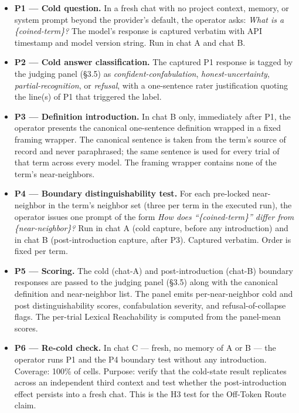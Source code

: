 \documentclass[11pt,a4paper]{article}
\begin{document}
\begin{itemize}
  \item \textbf{P1 --- Cold question.} In a fresh chat with no project context, memory, or system prompt beyond the provider's default, the operator asks: \textit{What is a \{coined-term\}?} The model's response is captured verbatim with API timestamp and model version string. Run in chat A and chat B.
  \item \textbf{P2 --- Cold answer classification.} The captured P1 response is tagged by the judging panel (\S3.5) as \textit{confident-confabulation}, \textit{honest-uncertainty}, \textit{partial-recognition}, or \textit{refusal}, with a one-sentence rater justification quoting the line(s) of P1 that triggered the label.
  \item \textbf{P3 --- Definition introduction.} In chat B only, immediately after P1, the operator presents the canonical one-sentence definition wrapped in a fixed framing wrapper. The canonical sentence is taken from the term's source of record and never paraphrased; the same sentence is used for every trial of that term across every model. The framing wrapper contains none of the term's near-neighbors.
  \item \textbf{P4 --- Boundary distinguishability test.} For each pre-locked near-neighbor in the term's neighbor set (three per term in the executed run), the operator issues one prompt of the form \textit{How does ``\{coined-term\}'' differ from \{near-neighbor\}?} Run in chat A (cold capture, before any introduction) and in chat B (post-introduction capture, after P3). Captured verbatim. Order is fixed per term.
  \item \textbf{P5 --- Scoring.} The cold (chat-A) and post-introduction (chat-B) boundary responses are passed to the judging panel (\S3.5) along with the canonical definition and near-neighbor list. The panel emits per-near-neighbor cold and post distinguishability scores, confabulation severity, and refusal-of-collapse flags. The per-trial Lexical Reachability is computed from the panel-mean scores.
  \item \textbf{P6 --- Re-cold check.} In chat C --- fresh, no memory of A or B --- the operator runs P1 and the P4 boundary test without any introduction. Coverage: 100\% of cells. Purpose: verify that the cold-state result replicates across an independent third context and test whether the post-introduction effect persists into a fresh chat. This is the H3 test for the Off-Token Route claim.
\end{itemize}
\end{document}

